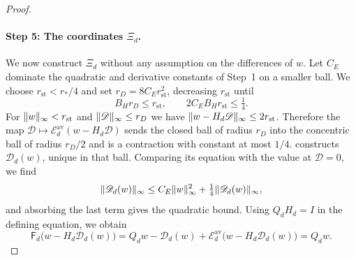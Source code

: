 \begin{proof}
\paragraph{Step 5: The coordinates $\Xi_d$.}
We now construct $\Xi_d$ without any assumption on the differences of $w$. Let $C_E$ dominate the quadratic and derivative constants of Step~1 on a smaller ball. We choose $r_{\mathrm{st}}<r_*/4$ and set $r_D=8C_Er_{\mathrm{st}}^2$, decreasing $r_{\mathrm{st}}$ until
\[
 B_Hr_D\le r_{\mathrm{st}},\qquad2C_EB_Hr_{\mathrm{st}}\le\tfrac14.
\]
For $\lVert w\rVert_\infty<r_{\mathrm{st}}$ and $\lVert \mathscr D\rVert_\infty\le r_D$ we have $\lVert w-H_d\mathscr D\rVert_\infty\le2r_{\mathrm{st}}$. Therefore the map $\mathscr D\mapsto\mathscr E_d^{\mathrm{av}}(w-H_d\mathscr D)$ sends the closed ball of radius $r_D$ into the concentric ball of radius $r_D/2$ and is a contraction with constant at most $1/4$.  constructs $\mathscr D_d(w)$, unique in that ball. Comparing its equation with the value at $\mathscr D=0$, we find
\begin{equation}\label{ch06:eq:D-quadratic}
 \lVert \mathscr D_d(w)\rVert_\infty\le C_E\lVert w\rVert_\infty^2+\tfrac14\lVert \mathscr D_d(w)\rVert_\infty,
\end{equation}
and absorbing the last term gives the quadratic bound. Using $Q_dH_d=I$ in the defining equation, we obtain
\[
 \mathsf F_d\bigl(w-H_d\mathscr D_d(w)\bigr)=Q_dw-\mathscr D_d(w)+\mathscr E_d^{\mathrm{av}}\bigl(w-H_d\mathscr D_d(w)\bigr)=Q_dw.
\]


\end{proof}
